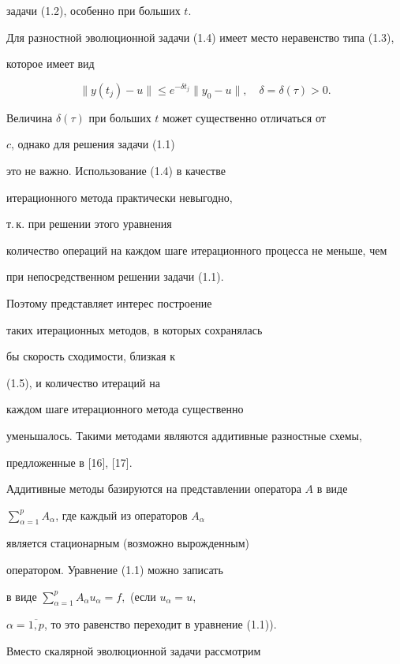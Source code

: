 задачи (1.2), особенно при больших $t$.





Для разностной эволюционной задачи (1.4) имеет место неравенство типа (1.3),


которое имеет вид


\begin{equation}


\|y(t_j)-u\|\le e^{-\delta t_j} \|y_0-u\|,\quad \delta=\delta(\tau)>0.


\end{equation}


Величина $\delta(\tau)$ при больших $t$ может существенно отличаться от


$c$, однако для решения задачи (1.1) 


это не важно. Использование (1.4) в качестве


итерационного метода практически невыгодно, 


т.\,к. при решении этого уравнения 


количество операций на каждом шаге итерационного процесса не меньше, чем


при непосредственном решении задачи (1.1). 


Поэтому представляет интерес построение


таких итерационных методов, в которых сохранялась 


бы скорость сходимости, близкая к


(1.5), и количество итераций на 


каждом шаге итерационного метода существенно


уменьшалось. Такими методами являются аддитивные разностные схемы, 


предложенные в [16], [17].


Аддитивные методы базируются на представлении оператора $A$ в виде


$\sum\limits_{\alpha=1} ^p A_\alpha$, где каждый из операторов $A_\alpha$


является стационарным (возможно вырожденным) 


оператором. Уравнение (1.1) можно записать 


в виде $\sum\limits_{\alpha=1}^p A_\alpha u_\alpha =f,$ (если $u_\alpha=u$,  


$\alpha=\overline {1,p}$, то это равенство переходит в уравнение (1.1)).


Вместо скалярной эволюционной задачи рассмотрим 


